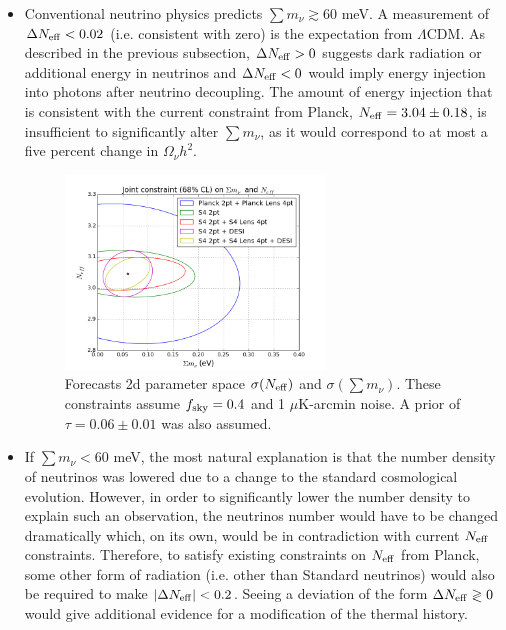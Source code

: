 \begin{itemize}


\item Conventional neutrino physics predicts $\sum m_\nu \gtrsim 60$ meV.  A measurement of $\Delta N_{\rm eff} < 0.02$ (i.e. consistent with zero) is the expectation from $\Lambda$CDM.  As described in the previous subsection, $\Delta N_{\rm eff}> 0$ suggests dark radiation or additional energy in neutrinos and $\Delta N_{\rm eff} < 0$ would imply energy injection into photons after neutrino decoupling.  The amount of energy injection that is consistent with the current constraint from Planck, $N_{\rm eff} = 3.04 \pm 0.18$, is insufficient to significantly alter $\sum m_\nu$, as it would correspond to at most a five percent change in $\Omega_\nu h^2$.



\begin{figure}[t!]
\begin{center}
\includegraphics[width=0.65\textwidth]{Neutrinos/Neff_Mnu.png}
\caption{Forecasts 2d parameter space $\sigma(N_{\rm eff})$ and $\sigma(\sum m_\nu)$.  These constraints assume $f_{\rm sky} = 0.4$ and  1 $\mu$K-arcmin noise.  A prior of $\tau = 0.06 \pm 0.01$ was also assumed. }
\label{fig:Neff_Mnu}
\end{center}
\end{figure} 

\item If $\sum m_\nu < 60$ meV, the most natural explanation is that the number density of neutrinos was lowered due to a change to the standard cosmological evolution.  However, in order to significantly lower the number density to explain such an observation, the neutrinos number would have to be changed dramatically which, on its own, would be in contradiction with current $N_{\rm eff}$ constraints.  Therefore, to satisfy existing constraints on $N_{\rm eff}$ from Planck, some other form of radiation (i.e. other than Standard neutrinos) would also be required to make $|\Delta N_{\rm eff}| < 0.2$.  Seeing a deviation of the form $\Delta N_{\rm eff} \gtrless 0$ would give additional evidence for a modification of the thermal history.


\end{itemize}
